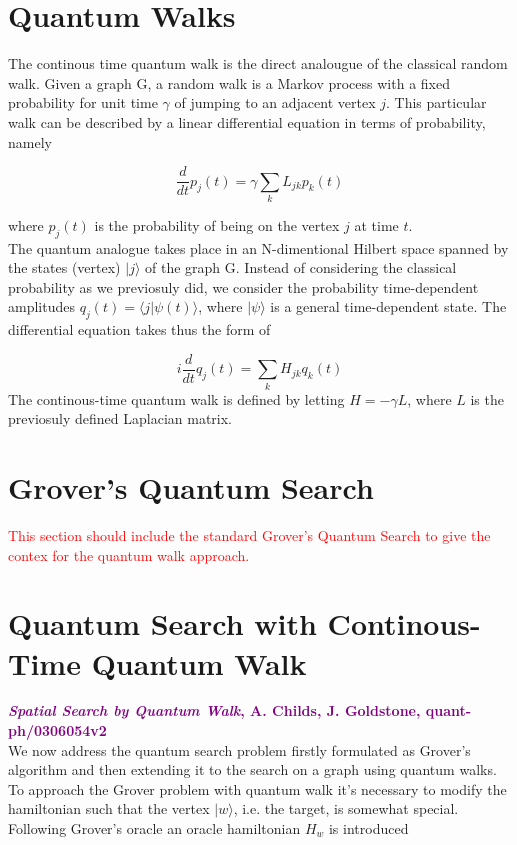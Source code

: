 \documentclass[11pt, twoside]{report}
\newcommand{\red}[1]{\textcolor{red}{#1}}
\newcommand{\purple}[3]{\textcolor{purple}{\textbf{\textit{#1}, #2, #3}}}
\begin{document}
\section{Quantum Walks}
The continous time quantum walk is the direct analougue of the classical random walk. Given a graph G, a random walk is a Markov process with a fixed probability for unit time $\gamma$ of jumping to an adjacent vertex $j$. This particular walk can be described by a linear differential equation in terms of probability, namely

\begin{equation}
  \frac{d}{dt}p_j(t) = \gamma\sum_{k}L_{jk}p_k(t)
\end{equation}

where $p_j(t)$ is the probability of being on the vertex $j$ at time $t$.\\
The quantum analogue takes place in an N-dimentional Hilbert space spanned by the states (vertex) $|j\rangle$ of the graph G. Instead of considering the classical probability as we previosuly did, we consider the probability time-dependent amplitudes $q_j(t) = \langle j|\psi(t)\rangle$, where $|\psi\rangle$ is a general time-dependent state. The differential equation takes thus the form of

\begin{equation}
  i\frac{d}{dt}q_j(t) = \sum_{k}H_{jk}q_k(t)
\end{equation}
The continous-time quantum walk is defined by letting $H=-\gamma L$, where $L$ is the previosuly defined Laplacian matrix.

\section{Grover's Quantum Search}
\red{This section should include the standard Grover's Quantum Search to give the contex for the quantum walk approach.}

\section{Quantum Search with Continous-Time Quantum Walk}
\purple{Spatial Search by Quantum Walk}{A. Childs, J. Goldstone}{quant-ph/0306054v2}\\
We now address the quantum search problem firstly formulated as Grover's algorithm and then extending it to the search on a graph using quantum walks. \\
To approach the Grover problem with quantum walk it's necessary to modify the hamiltonian such that the vertex $|w\rangle$, i.e. the target, is somewhat special. Following Grover's oracle an oracle hamiltonian $H_w$ is introduced
\end{document}
